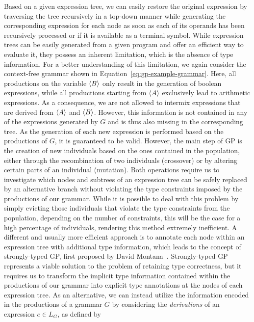 Based on a given expression tree, we can easily restore the original expression by traversing the tree recursively in a top-down manner while generating the corresponding expression for each node as soon as each of its operands has been recursively processed or if it is available as a terminal symbol.
While expression trees can be easily generated from a given program and offer an efficient way to evaluate it, they possess an inherent limitation, which is the absence of type information.
For a better understanding of this limitation, we again consider the context-free grammar shown in Equation~\eqref{eq:gp-example-grammar}.
Here, all productions on the variable $\langle B \rangle$ only result in the generation of boolean expressions, while all productions starting from $\langle A \rangle$ exclusively lead to arithmetic expressions.
As a consequence, we are not allowed to intermix expressions that are derived from $\langle A \rangle$ and $\langle B \rangle$.
However, this information is not contained in any of the expressions generated by $G$ and is thus also missing in the corresponding tree.
As the generation of each new expression is performed based on the productions of $G$, it is guaranteed to be valid.
However, the main step of GP is the creation of new individuals based on the ones contained in the population, either through the recombination of two individuals (crossover) or by altering certain parts of an individual (mutation). 
Both operations require us to investigate which nodes and subtrees of an expression tree can be safely replaced by an alternative branch without violating the type constraints imposed by the productions of our grammar.
While it is possible to deal with this problem by simply evicting those individuals that violate the type constraints from the population, depending on the number of constraints, this will be the case for a high percentage of individuals, rendering this method extremely inefficient.
A different and usually more efficient approach is to annotate each node within an expression tree with additional type information, which leads to the concept of strongly-typed GP, first proposed by David Montana~\cite{montana1995strongly}.
Strongly-typed GP represents a viable solution to the problem of retaining type correctness, but it requires us to transform the implicit type information contained within the productions of our grammar into explicit type annotations at the nodes of each expression tree.
As an alternative, we can instead utilize the information encoded in the productions of a grammar $G$ by considering the \emph{derivations} of an expression $e \in L_G$, as defined by
